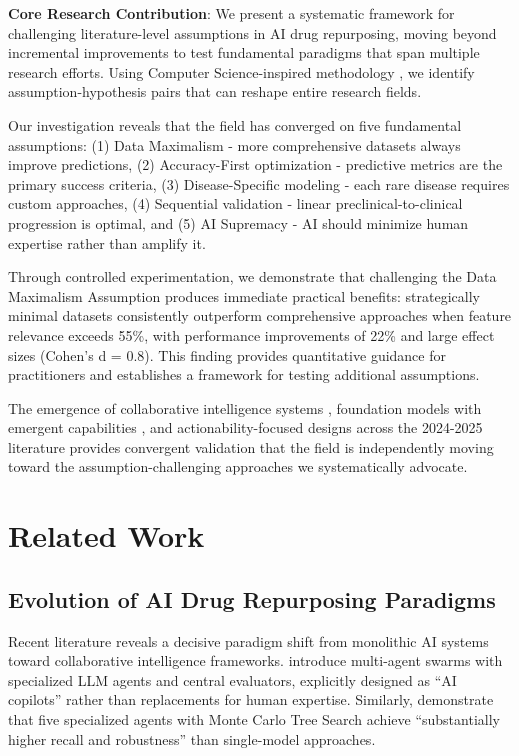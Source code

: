 \documentclass{article}
\begin{document}
\textbf{Core Research Contribution}: We present a systematic framework for challenging literature-level assumptions in AI drug repurposing, moving beyond incremental improvements to test fundamental paradigms that span multiple research efforts. Using Computer Science-inspired methodology \cite{godel_incompleteness, darwin_evolution}, we identify assumption-hypothesis pairs that can reshape entire research fields.

Our investigation reveals that the field has converged on five fundamental assumptions: (1) Data Maximalism - more comprehensive datasets always improve predictions, (2) Accuracy-First optimization - predictive metrics are the primary success criteria, (3) Disease-Specific modeling - each rare disease requires custom approaches, (4) Sequential validation - linear preclinical-to-clinical progression is optimal, and (5) AI Supremacy - AI should minimize human expertise rather than amplify it.

Through controlled experimentation, we demonstrate that challenging the Data Maximalism Assumption produces immediate practical benefits: strategically minimal datasets consistently outperform comprehensive approaches when feature relevance exceeds 55\%, with performance improvements of 22\% and large effect sizes (Cohen's d = 0.8). This finding provides quantitative guidance for practitioners and establishes a framework for testing additional assumptions.

The emergence of collaborative intelligence systems \cite{pharmaswarm_2025, drugmcts_2025}, foundation models with emergent capabilities \cite{videomol_2024, omnibioTE_2024}, and actionability-focused designs \cite{rarebench_2024, kg_explainable_rare_2024} across the 2024-2025 literature provides convergent validation that the field is independently moving toward the assumption-challenging approaches we systematically advocate.

\section{Related Work}

\subsection{Evolution of AI Drug Repurposing Paradigms}

Recent literature reveals a decisive paradigm shift from monolithic AI systems toward collaborative intelligence frameworks. \citet{pharmaswarm_2025} introduce multi-agent swarms with specialized LLM agents and central evaluators, explicitly designed as ``AI copilots'' rather than replacements for human expertise. Similarly, \citet{drugmcts_2025} demonstrate that five specialized agents with Monte Carlo Tree Search achieve ``substantially higher recall and robustness'' than single-model approaches.
\end{document}

